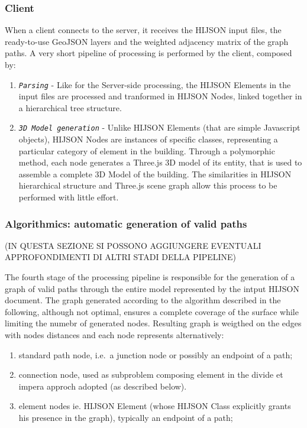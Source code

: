 \documentclass{sig-alternate}
\begin{document}
\subsubsection{Client}\label{client}

When a client connects to the server, it receives the HIJSON input
files, the ready-to-use GeoJSON layers and the weighted adjacency matrix
of the graph paths. A very short pipeline of processing is performed by
the client, composed by: 

\begin{enumerate}
\itemsep1pt\parskip0pt
\item
  \textit{\texttt{Parsing}} - Like for the Server-side processing, the HIJSON Elements in the input files are processed and tranformed in HIJSON Nodes, linked together in a hierarchical tree structure. 
\item
\textit{\texttt{3D Model generation}} - Unlike HIJSON Elements (that are simple Javascript objects), HIJSON Nodes are instances of specific classes, representing a particular category of element in the building. Through a polymorphic method, each node generates a Three.js 3D model of its entity, that is used to assemble a complete 3D Model of the building. The similarities in HIJSON hierarchical structure and Three.js scene graph allow this process to be performed with little effort.
\end{enumerate}

\subsubsection{Algorithmics: automatic generation of valid paths}\label{algorithmics-automatic-generation-of-valid-paths}

(IN QUESTA SEZIONE SI POSSONO AGGIUNGERE EVENTUALI APPROFONDIMENTI DI
ALTRI STADI DELLA PIPELINE)

The fourth stage of the processing pipeline is responsible for the
generation of a graph of valid paths through the entire model
represented by the intput HIJSON document. The graph generated according
to the algorithm described in the following, although not optimal,
ensures a complete coverage of the surface while limiting the numebr of
generated nodes. Resulting graph is weigthed on the edges with nodes
distances and each node represents alternatively:

\begin{enumerate}
\def\labelenumi{\alph{enumi}.}
\itemsep1pt\parskip0pt
\item
  standard path node, i.e.~a junction node or possibly an endpoint of a
  path;
\item
  connection node, used as subproblem composing element in the divide et
  impera approch adopted (as described below).
\item
  element nodes ie. HIJSON Element (whose HIJSON Class explicitly grants
  his presence in the graph), typically an endpoint of a path;
\end{enumerate}
\end{document}
